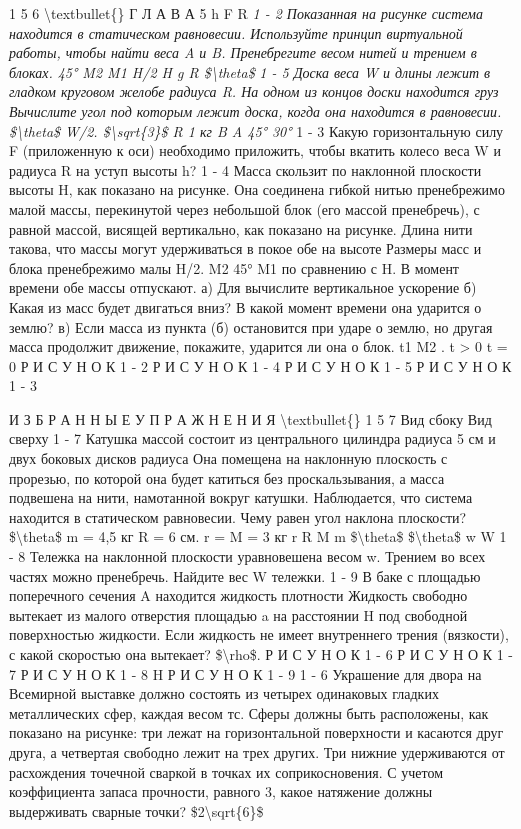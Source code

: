\documentclass[10pt,oneside]{article}
\begin{document}
1 5 6 \textbackslash{}textbullet\{\} Г Л А В А  5 h F R \emph{ 1 - 2 Показанная на рисунке система находится в статическом равновесии. Используйте принцип виртуальной работы, чтобы найти веса A и B. Пренебрегите весом нитей и трением в блоках. 45° M2 M1 H/2 H g R \$\textbackslash{}theta\$ } \emph{ 1 - 5 Доска веса W и длины лежит в гладком круговом желобе радиуса R. На одном из концов доски находится груз Вычислите угол под которым лежит доска, когда она находится в равновесии. \$\textbackslash{}theta\$ W/2. \$\textbackslash{}sqrt\{3\}\$ R 1 кг B A 45° 30° } 1 - 3 Какую горизонтальную силу F (приложенную к оси) необходимо приложить, чтобы вкатить колесо веса W и радиуса R на уступ высоты h? \emph{ } 1 - 4 Масса скользит по наклонной плоскости высоты H, как показано на рисунке. Она соединена гибкой нитью пренебрежимо малой массы, перекинутой через небольшой блок (его массой пренебречь), с равной массой, висящей вертикально, как показано на рисунке. Длина нити такова, что массы могут удерживаться в покое обе на высоте Размеры масс и блока пренебрежимо малы H/2. M2 45° M1 по сравнению с H. В момент времени обе массы отпускают. а) Для вычислите вертикальное ускорение б) Какая из масс будет двигаться вниз? В какой момент времени она ударится о землю? в) Если масса из пункта (б) остановится при ударе о землю, но другая масса продолжит движение, покажите, ударится ли она о блок. t1 M2 . t > 0 t = 0 Р И С У Н О К  1 - 2 Р И С У Н О К  1 - 4 Р И С У Н О К  1 - 5 Р И С У Н О К  1 - 3\par

И З Б Р А Н Н Ы Е  У П Р А Ж Н Е Н И Я \textbackslash{}textbullet\{\} 1 5 7 Вид сбоку Вид сверху \emph{ } 1 - 7 Катушка массой состоит из центрального цилиндра радиуса 5 см и двух боковых дисков радиуса Она помещена на наклонную плоскость с прорезью, по которой она будет катиться без проскальзывания, а масса подвешена на нити, намотанной вокруг катушки. Наблюдается, что система находится в статическом равновесии. Чему равен угол наклона плоскости? \$\textbackslash{}theta\$ m = 4,5 кг R = 6 см. r = M = 3 кг r R M m \$\textbackslash{}theta\$ \$\textbackslash{}theta\$ w W \emph{ } 1 - 8 Тележка на наклонной плоскости уравновешена весом w. Трением во всех частях можно пренебречь. Найдите вес W тележки. \emph{ } 1 - 9 В баке с площадью поперечного сечения A находится жидкость плотности Жидкость свободно вытекает из малого отверстия площадью a на расстоянии H под свободной поверхностью жидкости. Если жидкость не имеет внутреннего трения (вязкости), с какой скоростью она вытекает? \$\textbackslash{}rho\$. Р И С У Н О К  1 - 6 Р И С У Н О К  1 - 7 Р И С У Н О К  1 - 8 H Р И С У Н О К  1 - 9 \emph{ } 1 - 6 Украшение для двора на Всемирной выставке должно состоять из четырех одинаковых гладких металлических сфер, каждая весом тс. Сферы должны быть расположены, как показано на рисунке: три лежат на горизонтальной поверхности и касаются друг друга, а четвертая свободно лежит на трех других. Три нижние удерживаются от расхождения точечной сваркой в точках их соприкосновения. С учетом коэффициента запаса прочности, равного 3, какое натяжение должны выдерживать сварные точки? \$2\textbackslash{}sqrt\{6\}\$\par
\end{document}
